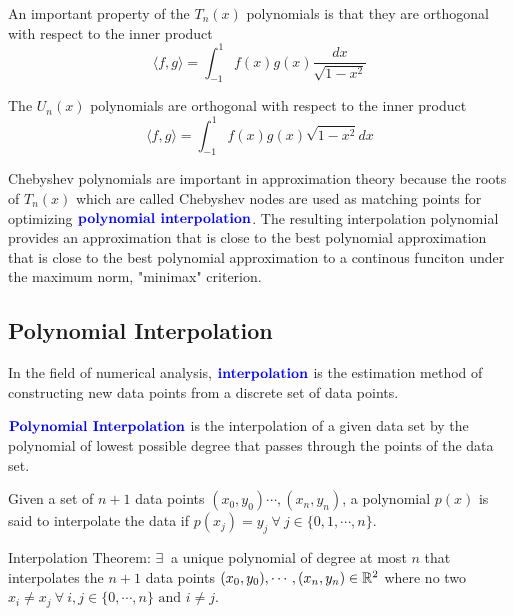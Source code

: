 \documentclass[12pt]{scrartcl}
\begin{document}
\begin{note}
    An important property of the $T_n(x)$ polynomials is that they are orthogonal with respect to the inner product
    \[\langle f, g\rangle = \int_{-1}^1 f(x) g(x) \frac{dx}{\sqrt{1-x^2}}\]

The $U_n(x)$ polynomials are orthogonal with respect to the inner product 
    \[\langle f, g\rangle = \int_{-1}^1 f(x) g(x) \sqrt{1-x^2} dx\]
\end{note}

\begin{note}
    Chebyshev polynomials are important in approximation theory because the roots of $T_n(x)$ which are called Chebyshev nodes are used as matching points for optimizing $\textbf{\color{blue} polynomial interpolation}$. The resulting interpolation polynomial provides an approximation that is close to the best polynomial approximation that is close to the best polynomial approximation to a continous funciton under the maximum norm, "minimax" criterion. 
\end{note}

\subsection{Polynomial Interpolation}

\begin{definition}
    In the field of numerical analysis, $\textbf{\color{blue} interpolation}$ is the estimation method of constructing new data points from a discrete set of data points. 
\end{definition}

\begin{definition}
    $\textbf{\color{blue} Polynomial Interpolation}$ is the interpolation of a given data set by the polynomial of lowest possible degree that passes through the points of the data set.

Given a set of $n+1$ data points $(x_0, y_0) \cdots , (x_n, y_n)$, a polynomial $p(x)$ is said to interpolate the data if $p(x_j) = y_j \ \forall \ j \in \{0, 1, \cdots , n\}$. 
\end{definition}

\begin{theorem}
    Interpolation Theorem: $\exists \ $ a unique polynomial of degree at most $n$ that interpolates the $n+1$ data points $(x_0, y_0), \cdots, (x_n, y_n) \in \mathbb R^2$ where no two $x_i \neq x_j \ \forall \ i, j \in \{0, \cdots, n\} \text{ and } i \neq j$.
\end{theorem}
\end{document}
